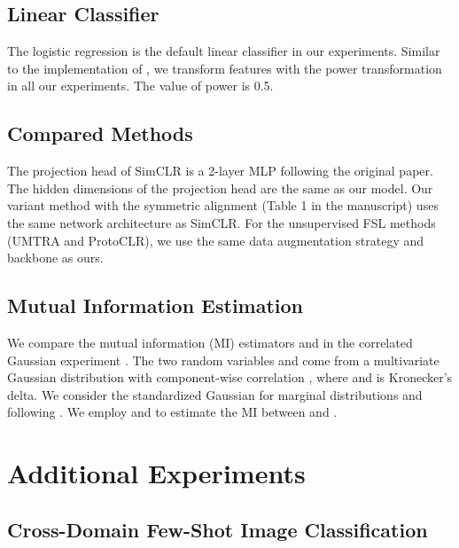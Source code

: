 \documentclass[runningheads]{llncs}
\begin{document}
\subsection{Linear Classifier}
The logistic regression is the default linear classifier in our experiments. Similar to the implementation of \cite{yang2021free}, we transform features with the power transformation in all our experiments. The value of power is 0.5.


\subsection{Compared Methods}

The projection head of SimCLR is a 2-layer MLP following the original paper.
The hidden dimensions of the projection head are the same as our model. 
Our variant method with the symmetric alignment (Table 1 in the manuscript) uses the same network architecture as SimCLR.
For the unsupervised FSL methods (UMTRA and ProtoCLR), we use the same data augmentation strategy and backbone as ours.

\subsection{Mutual Information Estimation}
We compare the mutual information (MI) estimators  and  in the correlated Gaussian experiment \cite{belghazi2018mutual}.
The two random variables  and  come from a multivariate Gaussian distribution with component-wise correlation , where  and  is Kronecker's delta.
We consider the standardized Gaussian for marginal distributions  and  following \cite{belghazi2018mutual}.
We employ  and  to estimate the MI  between  and .




\section{Additional Experiments}
\subsection{Cross-Domain Few-Shot Image Classification}
\end{document}
